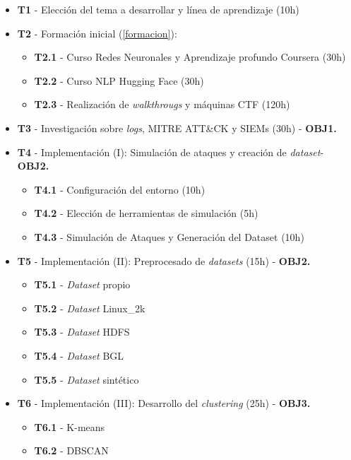 \begin{itemize}
    \item \textbf{T1} - Elección del tema a desarrollar y línea de aprendizaje (10h)
    \item \textbf{T2} - Formación inicial (\ref{formacion}):
    \begin{itemize}
        \item \textbf{T2.1} - Curso Redes Neuronales y Aprendizaje profundo Coursera (30h)
        \item \textbf{T2.2} -  Curso \gls{NLP} Hugging Face (30h)
        \item \textbf{T2.3} -  Realización de \textit{walkthrougs} y máquinas \gls{CTF} (120h)
    \end{itemize}
    \item \textbf{T3} - Investigación sobre \textit{logs}, MITRE \gls{ATT&CK} y \gls{SIEM}s (30h) - \textbf{OBJ1.}
    \item \textbf{T4} - Implementación (I): Simulación de ataques y creación de \textit{dataset}- \textbf{OBJ2.}
    \begin{itemize}
        \item \textbf{T4.1} - Configuración del entorno (10h)
        \item \textbf{T4.2} - Elección de herramientas de simulación (5h)
        \item \textbf{T4.3} - Simulación de Ataques y Generación del Dataset (10h)
    \end{itemize}
    \item \textbf{T5} - Implementación (II): Preprocesado de \textit{datasets} (15h) - \textbf{OBJ2.} 
    \begin{itemize}
        \item \textbf{T5.1} - \textit{Dataset} propio
        \item \textbf{T5.2} - \textit{Dataset} Linux\_2k
        \item \textbf{T5.3} - \textit{Dataset} \gls{HDFS}
        \item \textbf{T5.4} - \textit{Dataset} \gls{BGL}
        \item \textbf{T5.5} - \textit{Dataset} sintético
    \end{itemize}
    \item \textbf{T6} - Implementación (III): Desarrollo del \textit{clustering} (25h) - \textbf{OBJ3.}
    \begin{itemize}
        \item \textbf{T6.1} - K-means
        \item \textbf{T6.2} - \gls{DBSCAN}

\end{itemize}
\end{itemize}
